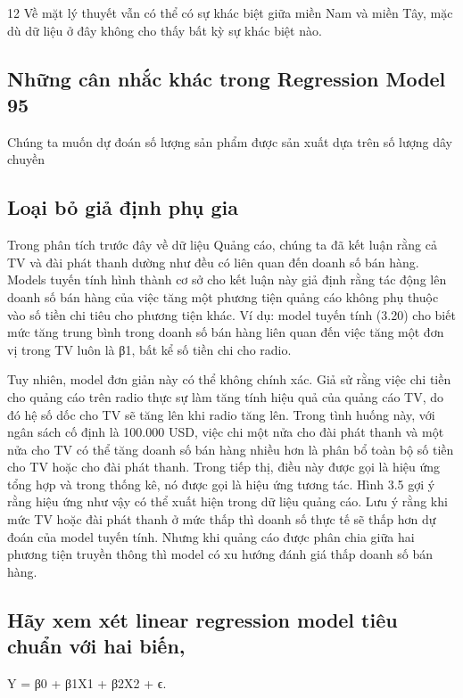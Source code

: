 12 Về mặt lý thuyết vẫn có thể có sự khác biệt giữa miền Nam và miền Tây, mặc dù dữ liệu ở đây không cho thấy bất kỳ sự khác biệt nào.

\subsection{Những cân nhắc khác trong Regression Model 95}

Chúng ta muốn dự đoán số lượng sản phẩm được sản xuất dựa trên số lượng dây chuyền

\subsection{Loại bỏ giả định phụ gia}

Trong phân tích trước đây về dữ liệu Quảng cáo, chúng ta đã kết luận rằng cả TV và đài phát thanh dường như đều có liên quan đến doanh số bán hàng. Models tuyến tính hình thành cơ sở cho kết luận này giả định rằng tác động lên doanh số bán hàng của việc tăng một phương tiện quảng cáo không phụ thuộc vào số tiền chi tiêu cho phương tiện khác. Ví dụ: model tuyến tính (3.20) cho biết mức tăng trung bình trong doanh số bán hàng liên quan đến việc tăng một đơn vị trong TV luôn là β1, bất kể số tiền chi cho radio.

Tuy nhiên, model đơn giản này có thể không chính xác. Giả sử rằng việc chi tiền cho quảng cáo trên radio thực sự làm tăng tính hiệu quả của quảng cáo TV, do đó hệ số dốc cho TV sẽ tăng lên khi radio tăng lên. Trong tình huống này, với ngân sách cố định là 100.000 USD, việc chi một nửa cho đài phát thanh và một nửa cho TV có thể tăng doanh số bán hàng nhiều hơn là phân bổ toàn bộ số tiền cho TV hoặc cho đài phát thanh. Trong tiếp thị, điều này được gọi là hiệu ứng tổng hợp và trong thống kê, nó được gọi là hiệu ứng tương tác. Hình 3.5 gợi ý rằng hiệu ứng như vậy có thể xuất hiện trong dữ liệu quảng cáo. Lưu ý rằng khi mức TV hoặc đài phát thanh ở mức thấp thì doanh số thực tế sẽ thấp hơn dự đoán của model tuyến tính. Nhưng khi quảng cáo được phân chia giữa hai phương tiện truyền thông thì model có xu hướng đánh giá thấp doanh số bán hàng.

\subsection{Hãy xem xét linear regression model tiêu chuẩn với hai biến,}

Y = β0 + β1X1 + β2X2 + ϵ.

